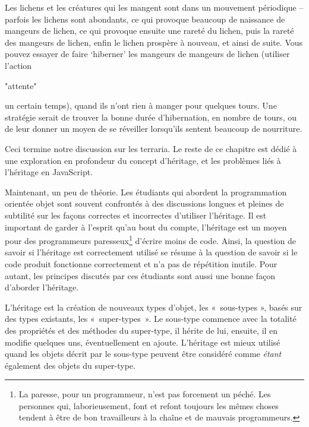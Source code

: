 \documentclass{FramateX}
\renewcommand{\texttt}[1]{\begin{sffamily}{#1}\end{sffamily}}
\begin{document}
Les lichens et les créatures qui les mangent sont dans un mouvement
périodique -- parfois les lichens sont abondants, ce qui provoque
beaucoup de naissance de mangeurs de lichen, ce qui provoque ensuite une
rareté du lichen, puis la rareté des mangeurs de lichen, enfin le lichen
prospère à nouveau, et ainsi de suite. Vous pouvez essayer de faire
`hiberner' les mangeurs de mangeurs de lichen (utiliser l'action
\texttt{"attente"} un certain temps), quand ils n'ont rien à manger pour
quelques tours. Une stratégie serait de trouver la bonne durée
d'hibernation, en nombre de tours, ou de leur donner un moyen de se
réveiller lorsqu'ils sentent beaucoup de nourriture.

\begin{center}\end{center}

Ceci termine notre discussion sur les terraria. Le reste de ce chapitre
est dédié à une exploration en profondeur du concept d'héritage, et les
problèmes liés à l'héritage en JavaScript.

\begin{center}\end{center}

Maintenant, un peu de théorie. Les étudiants qui abordent la
programmation orientée objet sont souvent confrontés à des discussions
longues et pleines de subtilité sur les façons correctes et incorrectes
d'utiliser l'héritage. Il est important de garder à l'esprit qu'au bout
du compte, l'héritage est un moyen pour des programmeurs
paresseux\footnote{La paresse, pour un programmeur, n'est pas forcement un péché. Les personnes qui, laborieusement, font et refont toujours les mêmes choses tendent à être de bon travailleurs à la chaîne et de mauvais programmeurs.} d'écrire moins de code. Ainsi, la
question de savoir si l'héritage est correctement utilisé se résume à la
question de savoir si le code produit fonctionne correctement et n'a pas
de répétition inutile. Pour autant, les principes discutés par ces
étudiants sont aussi une bonne façon d'aborder l'héritage.

L'héritage est la création de nouveaux types d'objet, les «~sous-types
», basés sur des types existants, les «~super-types~». Le sous-type
commence avec la totalité des propriétés et des méthodes du super-type,
il hérite de lui, ensuite, il en modifie quelques uns, éventuellement en
ajoute. L'héritage est mieux utilisé quand les objets décrit par le
sous-type peuvent être considéré comme \emph{étant} également des objets
du super-type.
\end{document}
